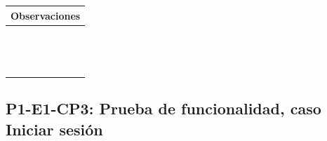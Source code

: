 \documentclass[oneside,10pt]{book}
\begin{document}
\begin{tabularx}{\textwidth}{ X }
\multicolumn{1}{X}{\cellcolor[HTML]{9B9B9B}\textbf{Observaciones}} \\ \hline
\multicolumn{1}{|l|}{ }	\\
\multicolumn{1}{|l|}{ }	\\
\multicolumn{1}{|l|}{ }	\\
\multicolumn{1}{|l|}{ }	\\
\multicolumn{1}{|l|}{ }	\\
\multicolumn{1}{|l|}{ }	\\
\multicolumn{1}{|l|}{ }	\\
\multicolumn{1}{|l|}{ }	\\
\multicolumn{1}{|l|}{ }	\\
\multicolumn{1}{|l|}{ }	\\
\multicolumn{1}{|l|}{ }	\\
\multicolumn{1}{|l|}{ }	\\
\multicolumn{1}{|l|}{ }	\\
\multicolumn{1}{|l|}{ }	\\ \hline
\end{tabularx}
\newpage
\subsection{P1-E1-CP3: Prueba de funcionalidad, caso Iniciar sesión}
\end{document}
